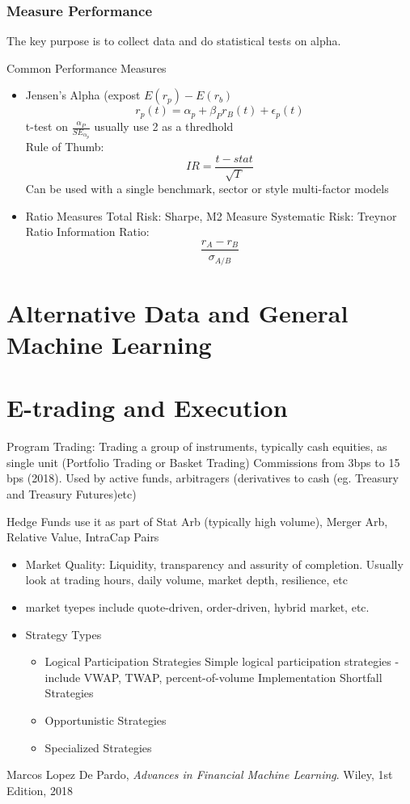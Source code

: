 \documentclass[11pt, openany]{book}              %
\begin{document}
  
\subsection{Measure Performance}

The key purpose is to collect data and do statistical tests on alpha. 

Common Performance Measures

\begin{itemize}
 \item Jensen's Alpha (expost $E(r_p) - E(r_b)$
 $$ r_p(t) = \alpha_p + \beta_P r_B(t) + \epsilon_p(t) $$
 t-test on $\frac{\alpha_P}{SE_{\alpha_p}}$ usually use 2 as a thredhold \\
 Rule of Thumb:
 $$IR = \frac{t-stat}{\sqrt{T}}$$
 Can be used with a single benchmark, sector or style multi-factor models
 \item Ratio Measures
	\subitem Total Risk: Sharpe, M2 Measure
	\subitem Systematic Risk: Treynor Ratio
	\subitem Information Ratio: $$ \frac{r_A - r_B}{\sigma_{A/B}}$$
\end{itemize}
  


\chapter{Alternative Data and General Machine Learning}

\chapter{E-trading and Execution}

Program Trading: Trading a group of instruments, typically cash equities, as single unit (Portfolio Trading or Basket Trading) Commissions from 3bps to 15 bps (2018). Used by active funds, arbitragers (derivatives to cash (eg. Treasury and Treasury Futures)etc)

Hedge Funds use it as part of Stat Arb (typically high volume), Merger Arb, Relative Value, IntraCap Pairs


\begin{itemize}
	\item Market Quality: Liquidity, transparency and assurity of completion. Usually look at trading hours, daily volume, market depth, resilience, etc
	\item market tyepes include quote-driven, order-driven, hybrid market, etc. 
	\item Strategy Types 
	\begin{itemize}
		\item Logical Participation Strategies 
			\subitem Simple logical participation strategies - include VWAP, TWAP, percent-of-volume
			\subitem Implementation Shortfall Strategies
		\item Opportunistic Strategies
		\item Specialized Strategies 
	\end{itemize}
\end{itemize}





\begin{thebibliography}{999}

  Marcos Lopez De Pardo, 
  \emph{Advances in Financial Machine Learning}.
  Wiley,
  1st Edition,
  2018

\end{thebibliography}
 
\end{document}
